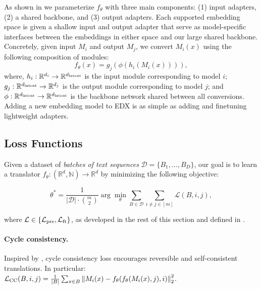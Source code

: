 As shown in  we parameterize $f_{\theta}$ with three main components: (1) input adapters, (2) a shared backbone, and (3) output adapters. Each supported embedding space is given a shallow input and output adapter that serve as model-specific interfaces between the embeddings in either space and our large shared backbone. Concretely, given input $M_i$ and output $M_j$, we convert $M_i(x)$ using the following composition of modules:
$$f_{\theta}(x) = g_{j}(\phi(h_i(M_i(x)))),$$
where, $h_i : \mathbb{R}^{d_i} \rightarrow \mathbb{R}^{d_{\rm latent}}$ is the input module corresponding to model $i$; $g_j : \mathbb{R}^{d_{\rm latent}} \rightarrow \mathbb{R}^{d_j}$ is the output module corresponding to model $j$; and $\phi: \mathbb{R}^{d_{\rm latent}} \rightarrow \mathbb{R}^{d_{\rm latent}}$ is the backbone network shared between all conversions. Adding a new embedding model to EDX is as simple as adding and finetuning lightweight adapters.

\subsection{Loss Functions}\label{sec:objectives}
Given a dataset of \textit{batches of text sequences} $\mathcal{D} = \{B_1, ..., B_D\}$, our goal is to learn a translator $f_{\theta} : (\mathbb{R}^{d}, \mathbb{N}) \rightarrow \mathbb{R}^{d}$ by minimizing the following objective:

\begin{equation}\label{eq:base_objective}
    \theta^* = \frac{1}{|\mathcal{D}|\cdot \binom{m}{2}}\arg \min_\theta \sum_{B\in\mathcal{D}}\sum_{i \neq j \in [m]}\mathcal{L}(B, i, j),
\end{equation}

where $\mathcal{L} \in \{\mathcal{L}_{\rm pre}, \mathcal{L}_{\rm ft}\}$, as developed in the rest of this section and defined in .


\paragraph{Cycle consistency.} Inspired by \citet{zhu2020cycleconsistency, hadji2021representationlearningglobaltemporal, shah2019cycleconsistencyrobustvisualquestion}, cycle consistency loss encourages reversible and self-consistent translations. In particular: $
\mathcal{L}_{\rm{CC}}(B,i,j) = \frac{1}{|B|}\sum_{x\in B}\left\| M_i(x) - f_{\theta}(f_{\theta}(M_i(x), j), i) \right\|_2^2$.


